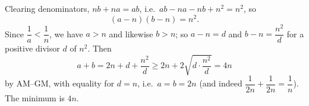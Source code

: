Clearing denominators, $nb+na=ab$, i.e.\ $ab-na-nb+n^2=n^2$, so
\[
(a-n)(b-n)=n^2 .
\]
Since $\dfrac{1}{a}<\dfrac{1}{n}$, we have $a>n$ and likewise $b>n$; so $a-n=d$ and $b-n=\dfrac{n^2}{d}$ for a positive divisor $d$ of $n^2$. Then
\[
a+b=2n+d+\dfrac{n^2}{d}\ge 2n+2\sqrt{d\cdot\dfrac{n^2}{d}}=4n
\]
by AM--GM, with equality for $d=n$, i.e.\ $a=b=2n$ (and indeed $\dfrac{1}{2n}+\dfrac{1}{2n}=\dfrac{1}{n}$). The minimum is $\boxed{4n}$.
